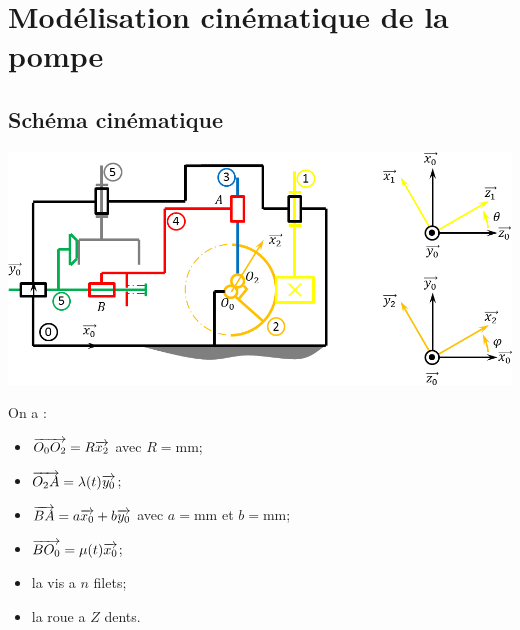 \documentclass[10pt]{article}
\begin{document}
\begin{minipage}[b]{.3\linewidth}
\begin{center}

\end{center}
\end{minipage}



\setlength{\parskip}{0ex plus 0.2ex minus 0ex}
 \renewcommand{\contentsname}{}
 \renewcommand{\baselinestretch}{1}

\tableofcontents

 \renewcommand{\baselinestretch}{1.2}
\setlength{\parskip}{2ex plus 0.5ex minus 0.2ex}



\section{Modélisation cinématique de la pompe}
\subsection{Schéma cinématique}


\begin{center}
 \includegraphics[width=.95\textwidth]{images/SchemaCinematique}
\end{center}

On a : 
\begin{itemize}
\item $\overrightarrow{O_0 O_2} = R \overrightarrow{x_2}$ avec $R= \text{mm}$;
\item $\overrightarrow{O_2 A} = \lambda(t) \overrightarrow{y_0}$;
\item $\overrightarrow{BA} = a \overrightarrow{x_0}+b \overrightarrow{y_0}$ avec $a= \text{mm}$ et $b= \text{mm}$;
\item $\overrightarrow{B O_0} = \mu(t) \overrightarrow{x_0}$;
\item la vis a $n$ filets;
\item la roue a $Z$ dents. 
\end{itemize}
\end{document}
